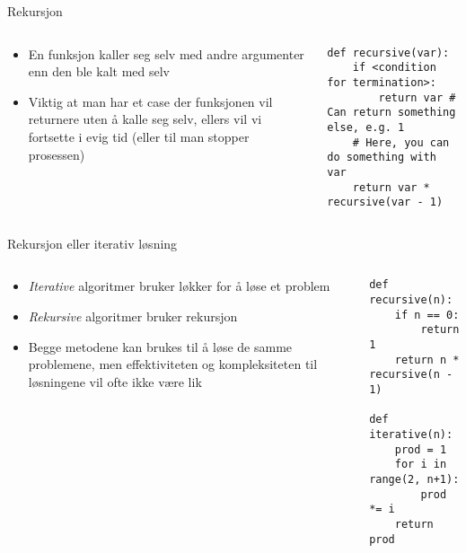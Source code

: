 \documentclass[screen, aspectratio=169]{beamer}
\begin{document}
\begin{frame}[fragile]{Rekursjon}
	\begin{columns}
		\begin{column}{.5\textwidth}
			\begin{itemize}
				\item En funksjon kaller seg selv med andre argumenter enn den ble kalt med selv
				\item Viktig at man har et case der funksjonen vil returnere uten å kalle seg selv, ellers vil vi fortsette i evig tid (eller til man stopper prosessen)
			\end{itemize}
		\end{column}
		\begin{column}{.5\textwidth}
			\begin{lstlisting}
def recursive(var):
	if <condition for termination>:
		return var # Can return something else, e.g. 1
	# Here, you can do something with var
	return var * recursive(var - 1)
			\end{lstlisting}
		\end{column}
	\end{columns}
\end{frame}

\begin{frame}[fragile]{Rekursjon eller iterativ løsning}
	\begin{columns}
		\begin{column}{.5\textwidth}
			\begin{itemize}
				\item \emph{Iterative} algoritmer bruker løkker for å løse et problem
				\item \emph{Rekursive} algoritmer bruker rekursjon
				\item Begge metodene kan brukes til å løse de samme problemene, men effektiviteten og kompleksiteten til løsningene vil ofte ikke være lik
			\end{itemize}
		\end{column}
		\begin{column}{.5\textwidth}
			\begin{lstlisting}
def recursive(n):
	if n == 0:
		return 1
	return n * recursive(n - 1)

def iterative(n):
	prod = 1
	for i in range(2, n+1):
		prod *= i
	return prod
			\end{lstlisting}
		\end{column}
	\end{columns}
\end{frame}
\end{document}
